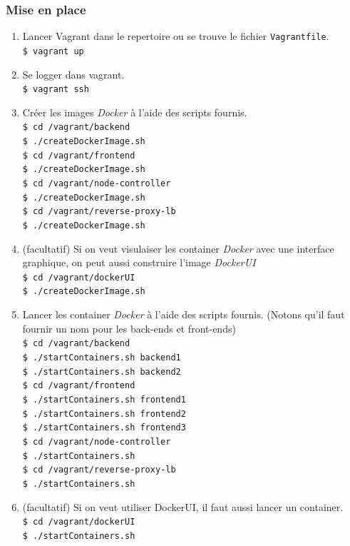 \documentclass[a4paper,11pt,titlepage]{article}
\begin{document}
\subsubsection{Mise en place}
\begin{enumerate}
	\item Lancer Vagrant dans le repertoire ou se trouve le fichier \texttt{Vagrantfile}.\\
		\texttt{\$ vagrant up}
	\item Se logger dans vagrant.\\
		\texttt{\$ vagrant ssh}
	\item Créer les images \emph{Docker} à l'aide des scripts fournis.\\
		\texttt{\$ cd /vagrant/backend}\\
		\texttt{\$ ./createDockerImage.sh}\\
		\texttt{\$ cd /vagrant/frontend}\\
		\texttt{\$ ./createDockerImage.sh}\\
		\texttt{\$ cd /vagrant/node-controller}\\
		\texttt{\$ ./createDockerImage.sh}\\
		\texttt{\$ cd /vagrant/reverse-proxy-lb}\\
		\texttt{\$ ./createDockerImage.sh}
	\item (facultatif) Si on veut visulaiser les container \emph{Docker} avec une interface graphique, on peut aussi construire
		l'image \emph{DockerUI}\\
		\texttt{\$ cd /vagrant/dockerUI}\\
		\texttt{\$ ./createDockerImage.sh}
	\item Lancer les container \emph{Docker} à l'aide des scripts fournis. (Notons qu'il faut fournir un nom pour les back-ends et front-ends)\\
		\texttt{\$ cd /vagrant/backend}\\
		\texttt{\$ ./startContainers.sh backend1}\\
		\texttt{\$ ./startContainers.sh backend2}\\
		\texttt{\$ cd /vagrant/frontend}\\
		\texttt{\$ ./startContainers.sh frontend1}\\
		\texttt{\$ ./startContainers.sh frontend2}\\
		\texttt{\$ ./startContainers.sh frontend3}\\
		\texttt{\$ cd /vagrant/node-controller}\\
		\texttt{\$ ./startContainers.sh}\\
		\texttt{\$ cd /vagrant/reverse-proxy-lb}\\
		\texttt{\$ ./startContainers.sh}
	\item (facultatif) Si on veut utiliser DockerUI, il faut aussi lancer un container.\\
		\texttt{\$ cd /vagrant/dockerUI}\\
		\texttt{\$ ./startContainers.sh}
\end{enumerate}
\end{document}
